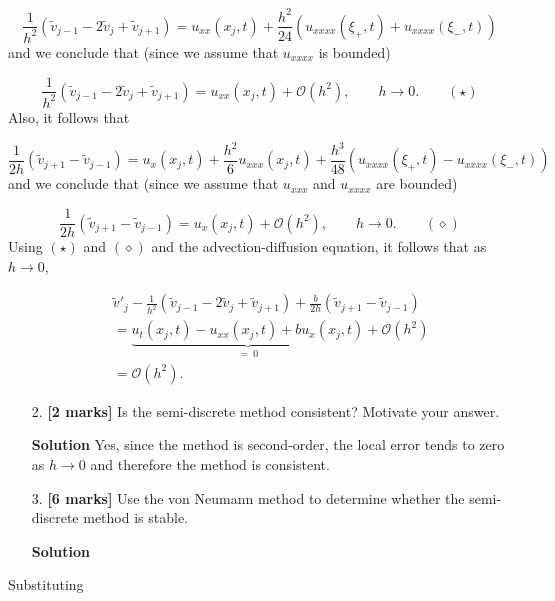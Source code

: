 \documentclass[12pt,a4paper]{article}
\begin{document}
\begin{equation*}
\frac{1}{h^2}\left(\widetilde{v}_{j-1} - 2\widetilde{v}_j + \widetilde{v}_{j+1}   \right) = u_{xx}(x_j,t) + \frac{h^2}{24}\left(u_{xxxx} (\xi_+,t) + u_{xxxx} (\xi_-,t)  \right)
\end{equation*}
and we conclude that (since we assume that $u_{xxxx}$ is bounded)


\begin{equation}
\frac{1}{h^2}\left(\widetilde{v}_{j-1} - 2\widetilde{v}_j + \widetilde{v}_{j+1}   \right) = u_{xx}(x_j,t) + \mathcal{O}\left(h^2\right), \qquad h \to 0. \qquad (\star)
\end{equation}
Also, it follows that


\begin{equation*}
\frac{1}{2h}\left(\widetilde{v}_{j+1} - \widetilde{v}_{j-1}   \right) = u_{x}(x_j,t) + \frac{h^2}{6}u_{xxx} (x_j,t) + \frac{h^3}{48}\left(u_{xxxx} (\xi_+,t) - u_{xxxx} (\xi_-,t)  \right)
\end{equation*}
and we conclude that (since we assume that $u_{xxx}$ and $u_{xxxx}$ are bounded)


\begin{equation}
\frac{1}{2h}\left(\widetilde{v}_{j+1} - \widetilde{v}_{j-1}   \right) = u_{x}(x_j,t) + \mathcal{O}\left(h^2\right), \qquad h \to 0. \qquad (\diamond)
\end{equation}
Using $(\star)$ and $(\diamond)$ and the advection-diffusion equation, it follows that as $h \to 0$,


\begin{eqnarray*}
&& \widetilde{v}'_j - \frac{1}{h^2}\left(\widetilde{v}_{j-1} - 2\widetilde{v}_j + \widetilde{v}_{j+1}   \right) + \frac{b}{2h}\left(\widetilde{v}_{j+1}  - \widetilde{v}_{j-1}   \right) \\
&& = \underbrace{u_t(x_j,t) - u_{xx}(x_j,t) + bu_{x}(x_j,t)}_{=\: 0} +  \mathcal{O}\left(h^2\right) \\
&& = \mathcal{O}\left(h^2\right).
\end{eqnarray*}
\begin{itemize}
\item[2. ] \textbf{[2 marks]} Is the semi-discrete method consistent?  Motivate your answer.

\textbf{Solution} Yes, since the method is second-order, the local error tends to zero as $h \to 0$ and therefore the method is consistent.


\item[3. ] \textbf{[6 marks]} Use the von Neumann method to determine whether the semi-discrete method is stable.

\textbf{Solution} 

\end{itemize}
Substituting
\end{document}
